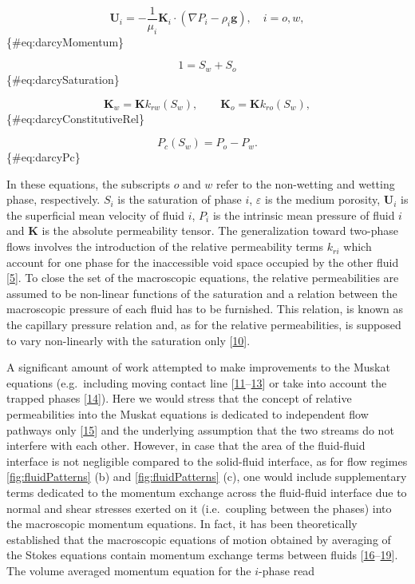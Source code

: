 \documentclass[]{article}
\begin{document}
\[
\mathbf{U}_{i}=-\frac{1}{\mu_{i}}\mathbf{K}_{i}\cdot(\nabla P_{i}-\rho_{i}\mathbf{g}),\quad i=o,w,
\] \{\#eq:darcyMomentum\}

\[
1=S_{w}+S_{o}
\] \{\#eq:darcySaturation\}

\[
\mathbf{K}_{w}=\mathbf{K}k_{rw}(S_{w}),\qquad\mathbf{K}_{o}=\mathbf{K}k_{ro}(S_{w}),
\] \{\#eq:darcyConstitutiveRel\}

\[
P_{c}(S_{w})=P_{o}-P_{w}.
\] \{\#eq:darcyPc\}

In these equations, the subscripts \(o\) and \(w\) refer to the
non-wetting and wetting phase, respectively. \(S_{i}\) is the saturation
of phase \(i\), \(\varepsilon\) is the medium porosity,
\(\mathbf{U}_{i}\) is the superficial mean velocity of fluid \(i\),
\(P_i\) is the intrinsic mean pressure of fluid \(i\) and \(\mathbf{K}\)
is the absolute permeability tensor. The generalization toward two-phase
flows involves the introduction of the relative permeability terms
\(k_{ri}\) which account for one phase for the inaccessible void space
occupied by the other fluid
{[}\protect\hyperlink{ref-dullien2012porous}{5}{]}. To close the set of
the macroscopic equations, the relative permeabilities are assumed to be
non-linear functions of the saturation and a relation between the
macroscopic pressure of each fluid has to be furnished. This relation,
is known as the capillary pressure relation and, as for the relative
permeabilities, is supposed to vary non-linearly with the saturation
only {[}\protect\hyperlink{ref-leverett1941capillary}{10}{]}.

A significant amount of work attempted to make improvements to the
Muskat equations (e.g.~including moving contact line
{[}\protect\hyperlink{ref-kalaydjian1992dynamic}{11}--\protect\hyperlink{ref-barenblatt2003mathematical}{13}{]}
or take into account the trapped phases
{[}\protect\hyperlink{ref-hilfer1998macroscopic}{14}{]}). Here we would
stress that the concept of relative permeabilities into the Muskat
equations is dedicated to independent flow pathways only
{[}\protect\hyperlink{ref-blunt2017multiphase}{15}{]} and the underlying
assumption that the two streams do not interfere with each other.
However, in case that the area of the fluid-fluid interface is not
negligible compared to the solid-fluid interface, as for flow regimes
\cref{fig:fluidPatterns} (b) and \cref{fig:fluidPatterns} (c), one would
include supplementary terms dedicated to the momentum exchange across
the fluid-fluid interface due to normal and shear stresses exerted on it
(i.e.~coupling between the phases) into the macroscopic momentum
equations. In fact, it has been theoretically established that the
macroscopic equations of motion obtained by averaging of the Stokes
equations contain momentum exchange terms between fluids
{[}\protect\hyperlink{ref-MARLE1982643}{16}--\protect\hyperlink{ref-kalaydjian1990origin}{19}{]}.
The volume averaged momentum equation for the \(i\)-phase read
\end{document}
